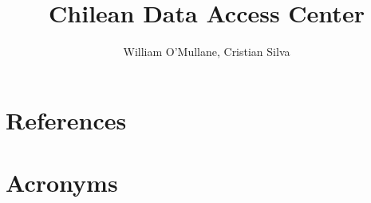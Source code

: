 \documentclass[lsstdraft,DM]{lsstdoc}
\title[Chilean DAC ]{ Chilean Data Access Center }
\author   {William O'Mullane, Cristian Silva}
\begin{document}
%
%
\maketitle

\renewcommand{\thepage}{\arabic{page}}%

\setcounter{page}{1}%
%
%


\section{References\label{sect:references}}
\renewcommand{\refname}{}


\section{Acronyms}
\end{document}
